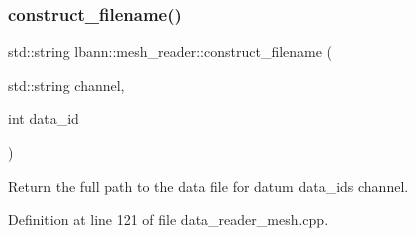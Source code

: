 \subsubsection{\texorpdfstring{construct\+\_\+filename()}{construct\_filename()}}
{\footnotesize\ttfamily std\+::string lbann\+::mesh\+\_\+reader\+::construct\+\_\+filename (\begin{DoxyParamCaption}\item[{std\+::string}]{channel,  }\item[{int}]{data\+\_\+id }\end{DoxyParamCaption})\hspace{0.3cm}{\ttfamily [protected]}}



Return the full path to the data file for datum data\+\_\+id\textquotesingle{}s channel. 



Definition at line 121 of file data\+\_\+reader\+\_\+mesh.\+cpp.


